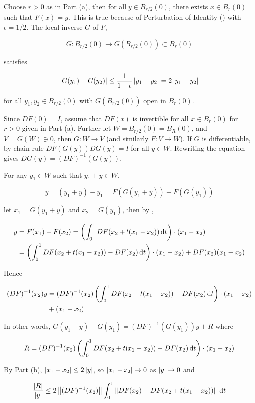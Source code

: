 \documentclass[a4paper,12pt]{article}
\begin{document}
\begin{thm}
   Choose $r>0$ as in Part (a), then for all $y\in B_{r/2}(0)$, there exists $x\in B_{r}(0)$ such that $F(x)=y$. This is true because of Perturbation of Identity (\rthm[\sctd{6}]) with $\epsilon=1/2$. The local inverse $G$ of $F$,

  $$G:B_{r/2}(0)\to G(B_{r/2}(0))\subset B_{r}(0)$$\s

  satisfies

  $$\left| G(y_{1})-G(y_{2})\right|\leq\frac{1}{1-\epsilon}\left| y_{1}-y_{2}\right|=2\left| y_{1}-y_{2}\right|$$\s

  for all $y_{1},y_{2}\in B_{r/2}(0)$ with $G(B_{r/2}(0))$ open in $B_{r}(0)$.\n

   Since $DF(0)=I$, assume that $DF(x)$ is invertible for all $x\in B_{r}(0)$ for $r>0$ given in Part (a). Further let $W=B_{r/2}(0)=B_{R}(0)$, and $V=G(W)\ni 0$, then $G:W\to V$ (and similarly $F:V\to W$). If $G$ is differentiable, by chain rule $DF(G(y))DG(y)=I$ for all $y\in W$. Rewriting the equation gives $DG(y)=(DF)^{-1}(G(y))$.\n

  For any $y_{1}\in W$ such that $y_{1}+y\in W$,

  $$y=(y_{1}+y)-y_{1}=F(G(y_{1}+y))-F(G(y_{1}))$$\s

  let $x_{1}=G(y_{1}+y)$ and $x_{2}=G(y_{1})$, then by \rpst[\sctd{3}],

  $$\begin{aligned}[t]
    y&=F(x_{1})-F(x_{2})=\left( \int_{0}^{1}DF(x_{2}+t(x_{1}-x_{2}))\,\mathrm{d} t\right)\cdot(x_{1}-x_{2})\\
    &=\left( \int_{0}^{1}DF(x_{2}+t(x_{1}-x_{2}))-DF(x_{2})\,\mathrm{d} t\right)\cdot(x_{1}-x_{2})+DF(x_{2})(x_{1}-x_{2})
  \end{aligned}$$\s

  Hence

  $$\begin{aligned}[t]
    (DF)^{-1}(x_{2})y&=(DF)^{-1}(x_{2})\left( \int_{0}^{1}DF(x_{2}+t(x_{1}-x_{2}))-DF(x_{2})\,\mathrm{d} t\right)\cdot(x_{1}-x_{2})\\
    &+(x_{1}-x_{2})
  \end{aligned}$$\s

  In other words, $G(y_{1}+y)-G(y_{1})=(DF)^{-1}(G(y_{1}))y+R$ where

  $$R=(DF)^{-1}(x_{2})\left( \int_{0}^{1}DF(x_{2}+t(x_{1}-x_{2}))-DF(x_{2})\,\mathrm{d} t\right)\cdot(x_{1}-x_{2})$$\s

  By Part (b), $\left| x_{1}-x_{2}\right|\leq 2\left| y\right|$, so $\left| x_{1}-x_{2}\right|\to 0$ as $\left| y\right|\to 0$ and

  $$\frac{\left| R\right|}{\left| y\right|}\leq 2\left\| (DF)^{-1}(x_{2})\right\|\int_{0}^{1}\left\| DF(x_{2})-DF(x_{2}+t(x_{1}-x_{2}))\right\|\,\mathrm{d} t$$\s


\end{thm}
\end{document}
